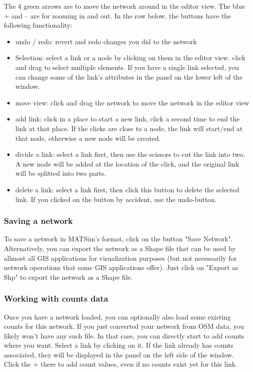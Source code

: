 \documentclass[a4paper,11pt]{report}
\begin{document}
The 4 green arrows are to move the network around in the editor view.  The blue + and – are for zooming in and out. In the row below, the  buttons have the following functionality:
\begin{itemize}
	\item undo / redo: revert and redo changes you did to the network
	\item Selection: select a link or a node by clicking on them in the editor  view. click and drag to select multiple elements. If you have a single  link selected, you can change some of the link's attributes in the panel  on the lower left of the window.
	\item move view: click and drag the network to move the network in the editor view
	\item add link: click in a place to start a new link, click a second time  to end the link at that place. If the clicks are close to a node, the  link will start/end at that node, otherwise a new node will be created.
	\item divide a link: select a link first, then use the scissors to cut the  link into two. A new node will be added at the location of the click,  and the original link will be splitted into two parts.
	\item delete a link: select a link first, then click this button to delete  the selected link. If you clicked on the button by accident, use the  undo-button.
\end{itemize}

\subsubsection{Saving a network}

To save a network in MATSim's format, click on the button "Save  Network". Alternatively, you can export the network as a Shape file that  can be used by allmost all GIS applications for visualization purposes  (but not necessarily for network operations that some GIS applications  offer). Just click on "Export as Shp" to export the network as a Shape  file.

\subsubsection{Working with counts data}

Once you have a network loaded, you can optionally also load some  existing counts for this network. If you just converted your network  from OSM data, you likely won't have any such file. In that case, you  can directly start to add counts where you want. Select a link by  clicking on it. If the link already has counts associated, they will be  displayed in the panel on the left side of the window. Click the + there  to add count values, even if no counts exist yet for this link.
\end{document}
